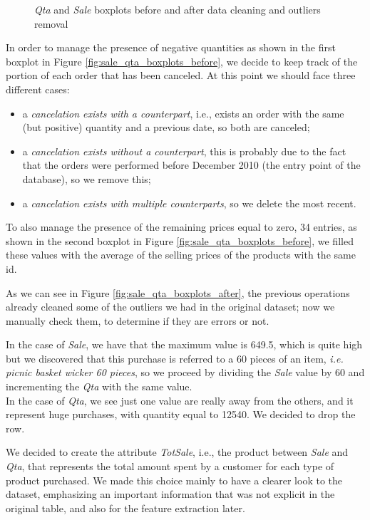 \begin{figure}
\begin{subfigure}{.32\textwidth}
\caption{}
\label{fig:sale_qta_boxplots_after2}
\end{subfigure}
\caption{\emph{Qta} and \emph{Sale} boxplots before and after data cleaning and outliers removal}
\end{figure}

In order to manage the presence of negative quantities as shown in the first boxplot in Figure \ref{fig:sale_qta_boxplots_before}, we decide to keep track of the portion of each order that has been canceled. At this point we should face three different cases:

\begin{itemize}
\item a \emph{cancelation exists with a counterpart}, i.e., exists an order with the same (but positive) quantity and a previous date, so both are canceled;
\item a \emph{cancelation exists without a counterpart}, this is probably due to the fact that the orders were performed before December 2010 (the entry point of the database), so we remove this;
\item a \emph{cancelation exists with multiple counterparts}, so we delete the most recent.
\end{itemize}

To also manage the presence of the remaining prices equal to zero, 34 entries, as shown in the second boxplot in Figure \ref{fig:sale_qta_boxplots_before}, we filled these values with the average of the selling prices of the products with the same id.

As we can see in Figure \ref{fig:sale_qta_boxplots_after}, the previous operations already cleaned some of the outliers we had in the original dataset; now we manually check them, to determine if they are errors or not.

In the case of \emph{Sale}, we have that the maximum value is 649.5, which is quite high but we discovered that this purchase is referred to a 60 pieces of an item, \emph{i.e. picnic basket wicker 60 pieces}, so we proceed by dividing the \emph{Sale} value by 60 and incrementing the \emph{Qta} with the same value.\\
In the case of \emph{Qta}, we see just one value are really away from the others, and it represent huge purchases, with quantity equal to 12540. We decided to drop the row.

We decided to create the attribute \emph{TotSale}, i.e., the product between \emph{Sale} and \emph{Qta}, that represents the total amount spent by a customer for each type of product purchased. We made this choice mainly to have a clearer look to the dataset, emphasizing an important information that was not explicit in the original table, and also for the feature extraction later.

